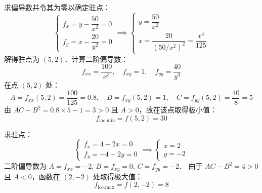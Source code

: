\begin{solution}
    求偏导数并令其为零以确定驻点：
    \begin{equation}
        \begin{cases}
            f_x = y - \dfrac{50}{x^2} = 0 \\
            f_y = x - \dfrac{20}{y^2} = 0
        \end{cases} \implies
        \begin{cases}
            y = \dfrac{50}{x^2} \\
            x = \dfrac{20}{(50/x^2)^2} = \dfrac{x^4}{125}
        \end{cases}
    \end{equation}
    解得驻点为 $(5, 2)$．计算二阶偏导数：
    \begin{equation}
        f_{xx} = \frac{100}{x^3}, \quad f_{xy} = 1, \quad f_{yy} = \frac{40}{y^3}
    \end{equation}
    在点 $(5, 2)$ 处：
    \begin{equation}
        A = f_{xx}(5, 2) = \frac{100}{125} = 0.8, \quad B = f_{xy}(5, 2) = 1, \quad C = f_{yy}(5, 2) = \frac{40}{8} = 5
    \end{equation}
    由 $AC - B^2 = 0.8 \times 5 - 1 = 3 > 0$ 且 $A > 0$，故在该点取得极小值：
    \begin{equation}
        \boxed{f_{\text{loc.min}} = f(5, 2) = 30}
    \end{equation}

    求驻点：
    \begin{equation}
        \begin{cases}
            f_x = 4 - 2x = 0 \\
            f_y = -4 - 2y = 0
        \end{cases} \implies
        \begin{cases}
            x = 2 \\
            y = -2
        \end{cases}
    \end{equation}
    二阶偏导数为 $A = f_{xx} = -2$, $B = f_{xy} = 0$, $C = f_{yy} = -2$．
    由于 $AC - B^2 = 4 > 0$ 且 $A < 0$，函数在 $(2, -2)$ 处取得极大值：
    \begin{equation}
        \boxed{f_{\text{loc.max}} = f(2, -2) = 8}
    \end{equation}


\end{solution}
